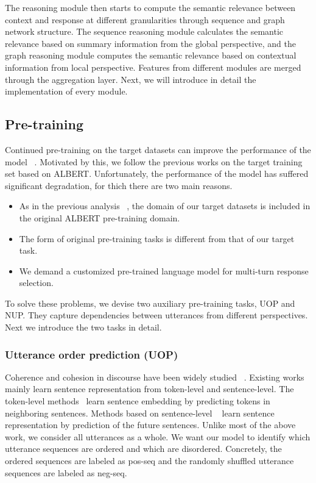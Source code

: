 \documentclass[letterpaper]{article} %
\begin{document}
The reasoning module then starts to compute the semantic relevance between context and response at different granularities through sequence and graph network structure. The sequence reasoning module calculates the semantic relevance based on summary information from the global perspective, and the graph reasoning module computes the semantic relevance based on contextual information from local perspective. Features from different modules
are merged through the aggregation layer. Next, we will introduce in detail the implementation of every module.

\subsection{Pre-training}
Continued pre-training on the target datasets can improve the performance of the model ~\cite{Gururangan2020}. Motivated by this, we follow the previous works on the target training set based on ALBERT. Unfortunately, the performance of the model has suffered significant degradation, for thich there are two main reasons.

\begin{itemize}
    \item As in the previous analysis ~\cite{Gururangan2020}, the domain of our target datasets is included in the original ALBERT pre-training domain.
    \item The form of original pre-training tasks is different from that of our target task.
    \item We demand a customized pre-trained language model for multi-turn response selection.
\end{itemize}

To solve these problems, we devise two auxiliary pre-training tasks, UOP and NUP. They capture dependencies between utterances from different perspectives. Next we introduce the two tasks in detail.

\subsubsection{Utterance order prediction (UOP)} Coherence and cohesion in discourse have been widely studied ~\cite{grosz1995centering}. Existing works mainly learn sentence representation from token-level and sentence-level. The token-level methods~\cite{kiros2015skip,hill2016learning} learn sentence embedding by predicting tokens in neighboring sentences. Methods based on sentence-level ~\cite{gan2017learning,Lan2020} learn sentence representation by prediction of the future sentences. Unlike most of the above work, we consider all utterances as a whole. We want our model to identify which utterance sequences are ordered and which are disordered. Concretely, the ordered sequences are labeled as pos-seq and the randomly shuffled utterance sequences are labeled as neg-seq.
\end{document}
